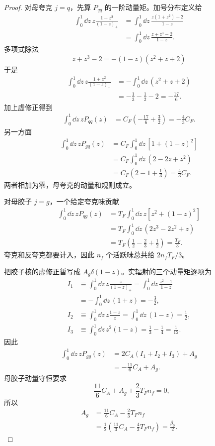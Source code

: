 \begin{proof}
对母夸克 $j=q$，先算 $P_{qq}$ 的一阶动量矩。加号分布定义给
\begin{align*}
 \int_0^1\dd z\,
 z\frac{1+z^2}{(1-z)_+}
 &=\int_0^1\dd z\,
 \frac{z(1+z^2)-2}{1-z}\\
 &=\int_0^1\dd z\,
 \frac{z+z^3-2}{1-z}.
\end{align*}
多项式除法
\begin{equation*}
 z+z^3-2=-(1-z)(z^2+z+2)
\end{equation*}
于是
\begin{align*}
 \int_0^1\dd z\,
 z\frac{1+z^2}{(1-z)_+}
 &=-\int_0^1\dd z\,(z^2+z+2)\\
 &=-\frac13-\frac12-2
 =-\frac{17}{6}.
\end{align*}
加上虚修正得到
\begin{align*}
 \int_0^1\dd z\,zP_{qq}(z)
 &=C_F\left(-\frac{17}{6}+\frac32\right)
 =-\frac43C_F.
\end{align*}
另一方面
\begin{align*}
 \int_0^1\dd z\,zP_{gq}(z)
 &=C_F\int_0^1\dd z\,
 \left[1+(1-z)^2\right]\\
 &=C_F\int_0^1\dd z\,(2-2z+z^2)\\
 &=C_F\left(2-1+\frac13\right)
 =\frac43C_F.
\end{align*}
两者相加为零，母夸克的动量和规则成立。

对母胶子 $j=g$，一个给定夸克味贡献
\begin{align*}
 \int_0^1\dd z\,zP_{qg}(z)
 &=T_F\int_0^1\dd z\,
 z\left[z^2+(1-z)^2\right]\\
 &=T_F\int_0^1\dd z\,
 (2z^3-2z^2+z)\\
 &=T_F\left(\frac12-\frac23+\frac12\right)
 =\frac{T_F}{3}.
\end{align*}
夸克和反夸克都要计入，因此 $n_f$ 个活跃味总共给 $2n_fT_F/3$。

把胶子核的虚修正暂写成 $A_g\delta(1-z)$。实辐射的三个动量矩逐项为
\begin{align*}
 I_1
 &\equiv\int_0^1\dd z\,
 z\frac{z}{(1-z)_+}
 =\int_0^1\dd z\,
 \frac{z^2-1}{1-z}\\
 &=-\int_0^1\dd z\,(1+z)
 =-\frac32,\\[2mm]
 I_2
 &\equiv\int_0^1\dd z\,z\frac{1-z}{z}
 =\int_0^1\dd z\,(1-z)
 =\frac12,\\[2mm]
 I_3
 &\equiv\int_0^1\dd z\,z^2(1-z)
 =\frac13-\frac14
 =\frac1{12}.
\end{align*}
因此
\begin{align*}
 \int_0^1\dd z\,zP_{gg}(z)
 &=2C_A(I_1+I_2+I_3)+A_g\\
 &=-\frac{11}{6}C_A+A_g.
\end{align*}
母胶子动量守恒要求
\begin{equation*}
 -\frac{11}{6}C_A+A_g+\frac23T_Fn_f=0,
\end{equation*}
所以
\begin{align*}
 A_g
 &=\frac{11}{6}C_A-\frac23T_Fn_f\\
 &=\frac12\left(\frac{11}{3}C_A-\frac43T_Fn_f\right)
 =\frac{\beta_0}{2}.
\end{align*}
\end{proof}

